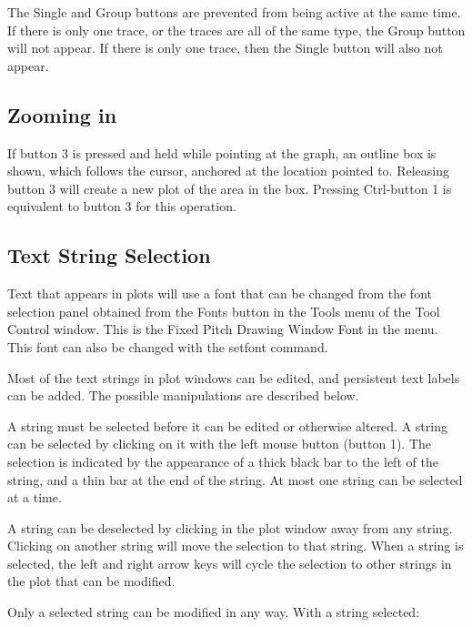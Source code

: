 \begin{description}
The {\cb Single} and {\cb Group} buttons are prevented from being
active at the same time.  If there is only one trace, or the traces
are all of the same type, the {\cb Group} button will not appear.  If
there is only one trace, then the {\cb Single} button will also not
appear.
\end{description}

\subsection{Zooming in}

If button 3 is pressed and held while pointing at the graph, an
outline box is shown, which follows the cursor, anchored at the
location pointed to.  Releasing button 3 will create a new plot of the
area in the box.  Pressing {\kb Ctrl}-button 1 is equivalent to button
3 for this operation.

\subsection{Text String Selection}

Text that appears in plots will use a font that can be changed from
the font selection panel obtained from the {\cb Fonts} button in the
{\cb Tools} menu of the {\cb Tool Control} window.  This is the {\cb
Fixed Pitch Drawing Window Font} in the menu.  This font can also be
changed with the {\cb setfont} command.

Most of the text strings in plot windows can be edited, and persistent
text labels can be added.  The possible manipulations are described
below.

A string must be selected before it can be edited or otherwise
altered.  A string can be selected by clicking on it with the left
mouse button (button 1).  The selection is indicated by the appearance
of a thick black bar to the left of the string, and a thin bar at the
end of the string.  At most one string can be selected at a time.

A string can be deselected by clicking in the plot window away from
any string.  Clicking on another string will move the selection to
that string.  When a string is selected, the left and right arrow keys
will cycle the selection to other strings in the plot that can be
modified.

Only a selected string can be modified in any way.  With a string
selected:

